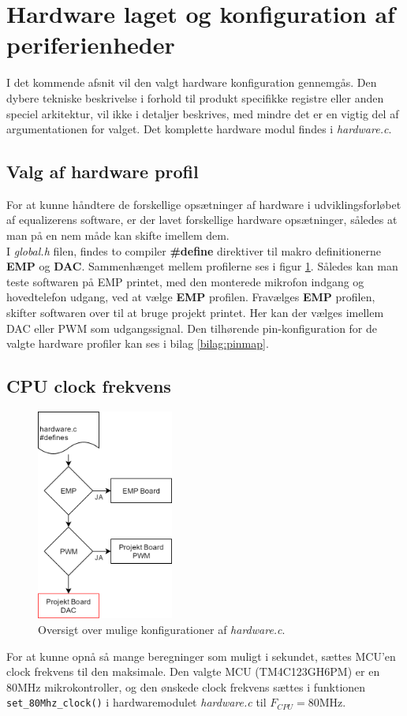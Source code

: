\section{Hardware laget og konfiguration af periferienheder}
I det kommende afsnit vil den valgt hardware konfiguration gennemgås. 
Den dybere tekniske beskrivelse i forhold til produkt specifikke registre eller anden speciel arkitektur, vil ikke i detaljer beskrives, med mindre det er en vigtig del af argumentationen for valget.
Det komplette hardware modul findes i \emph{hardware.c}.

\subsection{Valg af hardware profil}
For at kunne håndtere de forskellige opsætninger af hardware i udviklingsforløbet af equalizerens software, er der lavet forskellige hardware opsætninger, således at man på en nem måde kan skifte imellem dem.
\\
I \textit{global.h} filen, findes to compiler \textbf{\#define} direktiver til makro definitionerne \textbf{EMP} og \textbf{DAC}.
Sammenhænget mellem profilerne ses i figur \ref{fig:hardware_profiler}. 
Således kan man teste softwaren på EMP printet, med den monterede mikrofon indgang og hovedtelefon udgang, ved at vælge \textbf{EMP} profilen.
Fravælges \textbf{EMP} profilen, skifter softwaren over til at bruge projekt printet.
Her kan der vælges imellem DAC eller PWM som udgangssignal.  
Den tilhørende pin-konfiguration for de valgte hardware profiler kan ses i bilag \ref{bilag:pinmap}.

\subsection{CPU clock frekvens}
\begin{figure}
	\centering
	\includegraphics[width=4.5cm]{billeder/hardware_profiles.png}
	\caption{Oversigt over mulige konfigurationer af \textit{hardware.c}.}
	\label{fig:hardware_profiler}
\end{figure}
For at kunne opnå så mange beregninger som muligt i sekundet, sættes MCU'en clock frekvens til den maksimale.
Den valgte MCU (TM4C123GH6PM) er en $80\si{\mega\hertz}$ mikrokontroller, og den ønskede clock frekvens sættes i funktionen \texttt{set\_80Mhz\_clock()} i hardwaremodulet \textit{hardware.c} til $F_{CPU} = 80\si{\mega\hertz}$. 

